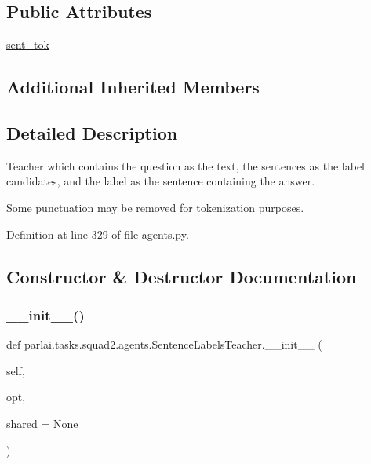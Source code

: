 \subsection*{Public Attributes}
\begin{DoxyCompactItemize}
\item 
\hyperlink{classparlai_1_1tasks_1_1squad2_1_1agents_1_1SentenceLabelsTeacher_a38eaa848e9051e5fb1b0a63f2308481e}{sent\+\_\+tok}
\end{DoxyCompactItemize}
\subsection*{Additional Inherited Members}


\subsection{Detailed Description}
\begin{DoxyVerb}Teacher which contains the question as the text, the sentences as the label
candidates, and the label as the sentence containing the answer.

Some punctuation may be removed for tokenization purposes.
\end{DoxyVerb}
 

Definition at line 329 of file agents.\+py.



\subsection{Constructor \& Destructor Documentation}
\mbox{\label{classparlai_1_1tasks_1_1squad2_1_1agents_1_1SentenceLabelsTeacher_acc15b4caefa5b72697761981c39873dc}} 
\subsubsection{\texorpdfstring{\+\_\+\+\_\+init\+\_\+\+\_\+()}{\_\_init\_\_()}}
{\footnotesize\ttfamily def parlai.\+tasks.\+squad2.\+agents.\+Sentence\+Labels\+Teacher.\+\_\+\+\_\+init\+\_\+\+\_\+ (\begin{DoxyParamCaption}\item[{}]{self,  }\item[{}]{opt,  }\item[{}]{shared = {\ttfamily None} }\end{DoxyParamCaption})}



